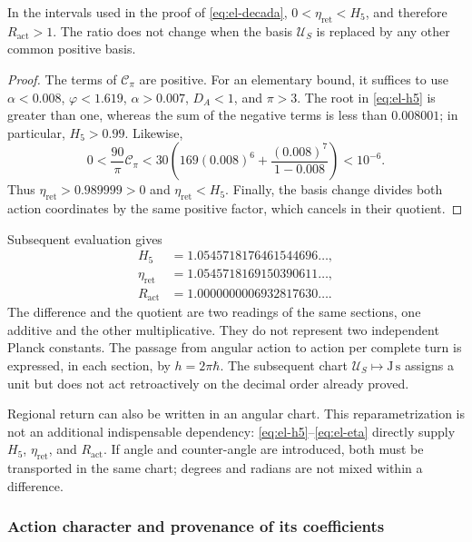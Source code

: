 \begin{proposition}\label{md:accion:positividad}
In the intervals used in the proof of \eqref{eq:el-decada},
\(0<\eta_{\mathrm{ret}}<H_5\), and therefore
\(R_{\mathrm{act}}>1\). The ratio does not change when the basis
\(\mathcal U_S\) is replaced by any other common positive basis.
\end{proposition}
\begin{proof}
The terms of \(\mathcal C_\pi\) are positive. For an elementary
bound, it suffices to use \(\alpha<0.008\), \(\varphi<1.619\),
\(\alpha>0.007\), \(D_A<1\), and \(\pi>3\). The root in
\eqref{eq:el-h5} is greater than one, whereas the sum of the negative
terms is less than \(0.008001\); in particular, \(H_5>0.99\).
Likewise,
\[
 0<\frac{90}{\pi}\mathcal C_\pi
 <30\left(169(0.008)^6+
           \frac{(0.008)^7}{1-0.008}\right)<10^{-6}.
\]
Thus \(\eta_{\mathrm{ret}}>0.989999>0\) and
\(\eta_{\mathrm{ret}}<H_5\). Finally, the basis change divides
both action coordinates by the same positive factor, which cancels in
their quotient.
\end{proof}

Subsequent evaluation gives
\begin{align*}
 H_5&=1.0545718176461544696\ldots,\\
 \eta_{\mathrm{ret}}&=1.0545718169150390611\ldots,\\
 R_{\mathrm{act}}&=1.0000000006932817630\ldots.
\end{align*}
The difference and the quotient are two readings of the same sections,
one additive and the other multiplicative. They do not represent two independent
Planck constants. The passage from angular action to action per complete
turn is expressed, in each section, by
\(h=2\pi\hbar\). The subsequent chart
\(\mathcal U_S\mapsto\mathrm{J\,s}\) assigns a unit but does not
act retroactively on the decimal order already proved.

Regional return can also be written in an angular chart.
This reparametrization is not an additional indispensable dependency:
\eqref{eq:el-h5}--\eqref{eq:el-eta} directly supply
\(H_5\), \(\eta_{\mathrm{ret}}\), and \(R_{\mathrm{act}}\). If
angle and counter-angle are introduced, both must be transported in the same
chart; degrees and radians are not mixed within a difference.

\subsubsection{Action character and provenance of its coefficients}
\label{sec:revision-planck}

